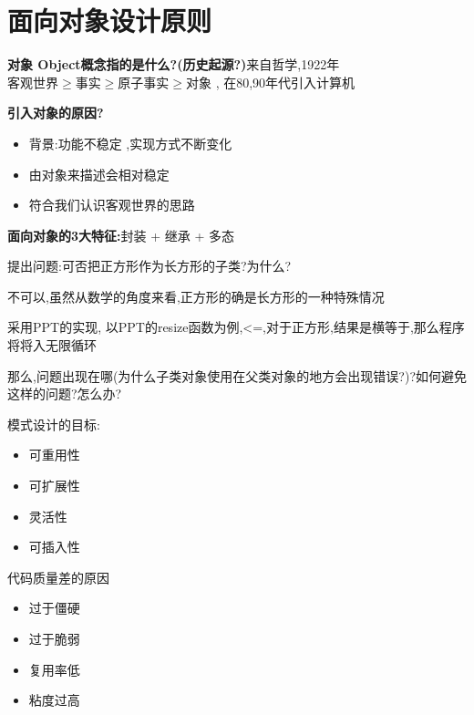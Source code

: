 \documentclass[UTF8,a4paper]{ctexart}
\begin{document}
\section{面向对象设计原则}
\textbf{对象 Object概念指的是什么?(历史起源?)}来自哲学,1922年$客观世界 \geq 事实 \geq 原子事实 \geq 对象$ , 在80,90年代引入计算机

\textbf{引入对象的原因?}
\begin{itemize}
  \item 背景:功能不稳定 ,实现方式不断变化
  \item 由对象来描述会相对稳定
  \item 符合我们认识客观世界的思路
\end{itemize}

\textbf{面向对象的3大特征:}封装 + 继承 + 多态

提出问题:可否把正方形作为长方形的子类?为什么?

不可以,虽然从数学的角度来看,正方形的确是长方形的一种特殊情况

采用PPT的实现,
以PPT的resize函数为例,<=,对于正方形,结果是横等于,那么程序将将入无限循环

那么,问题出现在哪(为什么子类对象使用在父类对象的地方会出现错误?)?如何避免这样的问题?怎么办?

模式设计的目标:
\begin{itemize}
  \item 可重用性
  \item 可扩展性
  \item 灵活性
  \item 可插入性
\end{itemize}

代码质量差的原因
\begin{itemize}
  \item 过于僵硬
  \item 过于脆弱
  \item 复用率低
  \item 粘度过高
\end{itemize}
\end{document}
